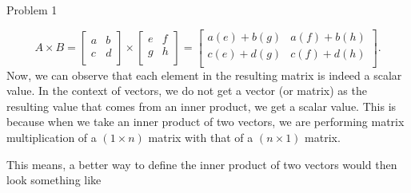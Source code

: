 \begin{problem}{Problem 1}
\begin{Highlight}
        \begin{equation}
            A \times B =
            \begin{bmatrix}
                a & b \\
                c & d \\
            \end{bmatrix}
            \times
            \begin{bmatrix}
                e & f \\
                g & h \\
            \end{bmatrix}
            = 
            \begin{bmatrix}
                a(e) + b(g) & a(f) + b(h) \\
                c(e) + d(g) & c(f) + d(h) \\
            \end{bmatrix}.
        \end{equation}
        Now, we can observe that each element in the resulting matrix is indeed a scalar value. In the context of vectors, we do not get a vector (or matrix) as the resulting value that comes from
        an inner product, we get a scalar value. This is because when we take an inner product of two vectors, we are performing matrix multiplication of a $(1 \times n)$ matrix with that of a 
        $(n \times 1)$ matrix.

        This means, a better way to define the inner product of two vectors would then look something like


\end{Highlight}
\end{problem}
